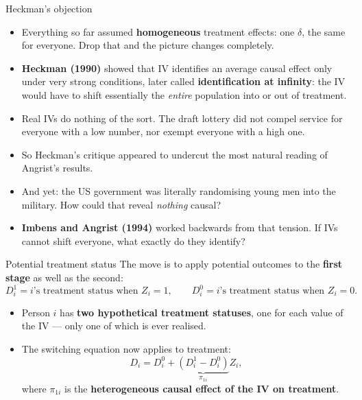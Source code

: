 \documentclass[
  11pt,
  ignorenonframetext,
  aspectratio=169,
]{beamer}
\providecommand{\tightlist}{%
  \setlength{\itemsep}{0pt}\setlength{\parskip}{0pt}}
\begin{document}
\begin{frame}{Heckman's objection}
\protect{}\label{heckmans-objection}
\begin{itemize}
\tightlist
\item
  Everything so far assumed \textbf{homogeneous} treatment effects: one
  \(\delta\), the same for everyone. Drop that and the picture changes
  completely.
\item
  \textbf{Heckman (1990)} showed that IV identifies an average causal
  effect only under very strong conditions, later called
  \textbf{identification at infinity}: the IV would have to shift
  essentially the \emph{entire} population into or out of treatment.
\item
  Real IVs do nothing of the sort. The draft lottery did not compel
  service for everyone with a low number, nor exempt everyone with a
  high one.
\item
  So Heckman's critique appeared to undercut the most natural reading of
  Angrist's results.
\item
  And yet: the US government was literally randomising young men into
  the military. How could that reveal \emph{nothing} causal?
\item
  \textbf{Imbens and Angrist (1994)} worked backwards from that tension.
  If IVs cannot shift everyone, what exactly do they identify?
\end{itemize}
\end{frame}

\begin{frame}{Potential treatment status}
\protect{}\label{potential-treatment-status}
The move is to apply potential outcomes to the \textbf{first stage} as
well as the second: \[
D_i^{1} = i\text{'s treatment status when } Z_i = 1,
\qquad
D_i^{0} = i\text{'s treatment status when } Z_i = 0 .
\]

\begin{itemize}
\tightlist
\item
  Person \(i\) has \textbf{two hypothetical treatment statuses}, one for
  each value of the IV --- only one of which is ever realised.
\item
  The switching equation now applies to treatment: \[
  D_i = D_i^{0} + \underbrace{(D_i^{1} - D_i^{0})}_{\pi_{1i}} Z_i ,
  \] where \(\pi_{1i}\) is the \textbf{heterogeneous causal effect of
  the IV on treatment}.
\end{itemize}
\end{frame}
\end{document}
